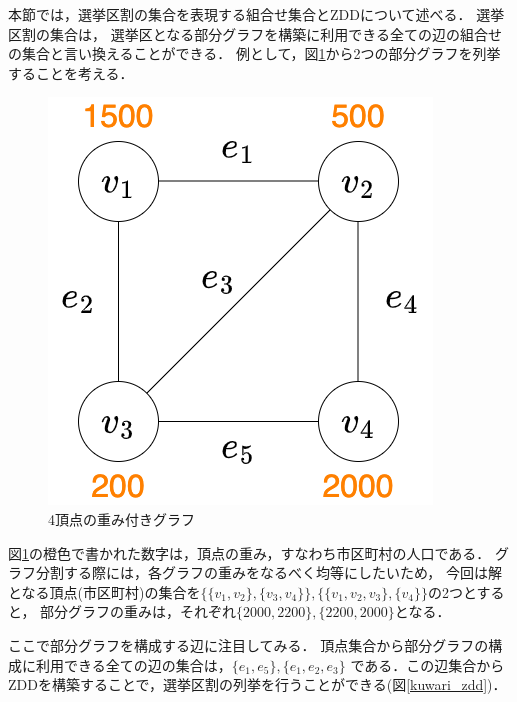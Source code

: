 本節では，選挙区割の集合を表現する組合せ集合とZDDについて述べる．
選挙区割の集合は，
選挙区となる部分グラフを構築に利用できる全ての辺の組合せの集合と言い換えることができる．
例として，図\ref{kuwari}から2つの部分グラフを列挙することを考える．

\begin{figure}[htbp]
  \centering
  \includegraphics[scale=0.3]{img/kuwari.png}
  \caption{4頂点の重み付きグラフ}
  \label{kuwari}
\end{figure}

図\ref{kuwari}の橙色で書かれた数字は，頂点の重み，すなわち市区町村の人口である．
グラフ分割する際には，各グラフの重みをなるべく均等にしたいため，
今回は解となる頂点(市区町村)の集合を$\{\{v_1,v_2\},\{v_3,v_4\}\},
\{\{v_1,v_2,v_3\}, \{v_4\}\}$の2つとすると，
部分グラフの重みは，それぞれ$\{2000, 2200\},\{2200, 2000\}$となる．

ここで部分グラフを構成する辺に注目してみる．
頂点集合から部分グラフの構成に利用できる全ての辺の集合は，$\{e_1, e_5\}, \{e_1,e_2,e_3\}$
である．この辺集合からZDDを構築することで，選挙区割の列挙を行うことができる(図\ref{kuwari_zdd})．


